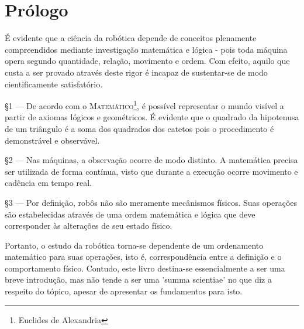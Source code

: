 \section{Prólogo}
É evidente que a ciência da robótica depende de conceitos plenamente compreendidos 
mediante investigação matemática e lógica - pois toda máquina opera segundo quantidade, 
relação, movimento e ordem. Com efeito, aquilo que custa a ser provado através deste rigor é incapaz de sustentar-se
de modo cientificamente satisfatório. 
\par
§1 --- De acordo com o \textsc{Matemático}\footnote{Euclides de Alexandria}, é possível 
representar o mundo visível a partir de axiomas lógicos e geométricos. É evidente que o 
quadrado da hipotenusa de um triângulo é a soma dos quadrados dos catetos pois o 
procedimento é demonstrável e observável.
\par
§2 --- Nas máquinas, a observação ocorre de modo distinto. A matemática precisa ser 
utilizada de forma contínua, visto que durante a execução ocorre movimento e cadência 
em tempo real. 
\par
§3 --- Por definição, robôs não são meramente mecânismos físicos. Suas operações são 
estabelecidas através de uma ordem matemática e lógica que deve corresponder às 
alterações de seu estado físico.
\par
Portanto, o estudo da robótica torna-se dependente de um ordenamento matemático para 
suas operações, isto é, correspondência entre a definição e o comportamento físico.
Contudo, este livro destina-se essencialmente a ser uma breve introdução, mas não tende 
a ser uma 'summa scientiae' no que diz a respeito do tópico, apesar de apresentar os 
fundamentos para isto. 